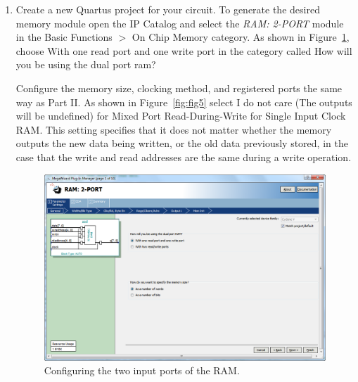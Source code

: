 \documentclass[epsfig,10pt,fullpage]{article}
\begin{document}
\begin{enumerate}
\item Create a new Quartus project for your circuit. To generate the desired memory
module open the IP Catalog and select the {\it RAM: 2-PORT} module in the 
{\sf Basic Functions $>$  On Chip Memory} category. As shown in Figure~\ref{fig:fig4}, 
choose {\sf With one read port and one write port} in the category called {\sf How will 
you be using the dual port ram?}

Configure the memory size, clocking method, and registered ports the same way as Part II.
As shown in Figure~\ref{fig:fig5} select {\sf I do not care (The outputs will be undefined)} 
for {\sf Mixed Port Read-During-Write for Single Input Clock RAM}.
This setting specifies that it does not matter whether the memory outputs the new data being 
written, or the old data previously stored, in the case that the write and read addresses are 
the same during a write operation.

\begin{figure}[H]
	\begin{center}
		\includegraphics[scale=0.50]{figures/figure4.png}
	\end{center}
	\caption{Configuring the two input ports of the RAM.}
	\label{fig:fig4}
\end{figure}


\end{enumerate}
\end{document}
